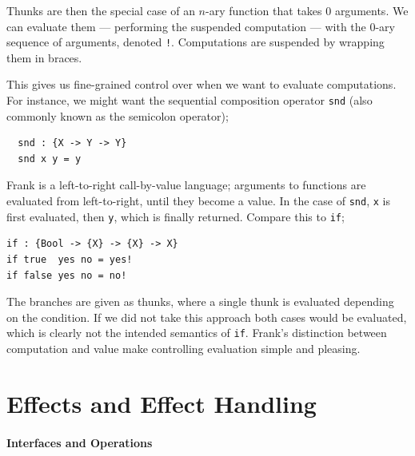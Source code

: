 \documentclass[msc,deptreport,cs]{infthesis} %
\newcommand{\code}[1]{\lstinline{#1}}
\newcommand{\todo}[1]
           {{\par\noindent\small\color{RoyalPurple}
  \framebox{\parbox{\dimexpr\linewidth-2\fboxsep-2\fboxrule}
    {\textbf{TODO:} #1}}}}
\begin{document}

Thunks are then the special case of an $n$-ary function that takes 0 arguments.
We can evaluate them --- performing the suspended computation --- with the 0-ary
sequence of arguments, denoted \code{!}. Computations are suspended by wrapping
them in braces.

This gives us fine-grained control over when we want to evaluate computations.
For instance, we might want the sequential composition operator \code{snd} (also
commonly known as the semicolon operator);

\begin{lstlisting}
  snd : {X -> Y -> Y}
  snd x y = y
\end{lstlisting}

Frank is a left-to-right call-by-value language; arguments to functions are
evaluated from left-to-right, until they become a value. In the case of
\code{snd}, \code{x} is first evaluated, then \code{y}, which is finally
returned. Compare this to \code{if};

\begin{lstlisting}
if : {Bool -> {X} -> {X} -> X}
if true  yes no = yes!
if false yes no = no!
\end{lstlisting}

\noindent The branches are given as thunks, where a single thunk is evaluated
depending on the condition. If we did not take this approach both cases would be
evaluated, which is clearly not the intended semantics of \code{if}. Frank's
distinction between computation and value make controlling evaluation simple and
pleasing.


\section{Effects and Effect Handling}
\label{sec:effects}

\paragraph*{Interfaces and Operations}
\end{document}
